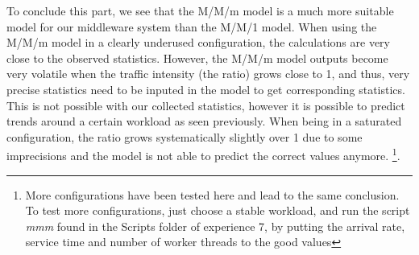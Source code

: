 \documentclass[11pt,a4paper]{article}
\begin{document}
To conclude this part, we see that the M/M/m model is a much more suitable model for our middleware system than the M/M/1 model. When using the M/M/m model in a clearly underused configuration, the calculations are very close to the observed statistics. However, the M/M/m model outputs become very volatile when the traffic intensity (the ratio) grows close to 1, and thus, very precise statistics need to be inputed in the model to get corresponding statistics. This is not possible with our collected statistics, however it is possible to predict trends around a certain workload as seen previously. When being in a saturated configuration, the ratio grows systematically slightly over 1 due to some imprecisions and the model is not able to predict the correct values anymore. \footnote{More configurations have been tested here and lead to the same conclusion. To test more configurations, just choose a stable workload, and run the script \textit{mmm} found in the Scripts folder of experience 7, by putting the arrival rate, service time and number of worker threads to the good values}.  
\end{document}
